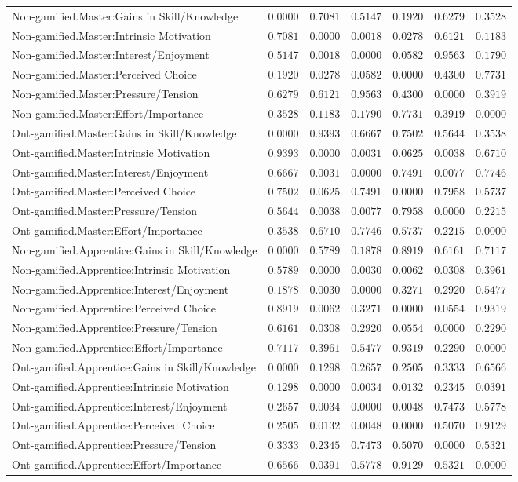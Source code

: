 \begin{landscape}
{\begin{longtable}{lrrrrrr}
Non-gamified.Master:Gains in Skill/Knowledge&$0.0000$&$0.7081$&$0.5147$&$0.1920$&$0.6279$&$0.3528$\tabularnewline
Non-gamified.Master:Intrinsic Motivation&$0.7081$&$0.0000$&$0.0018$&$0.0278$&$0.6121$&$0.1183$\tabularnewline
Non-gamified.Master:Interest/Enjoyment&$0.5147$&$0.0018$&$0.0000$&$0.0582$&$0.9563$&$0.1790$\tabularnewline
Non-gamified.Master:Perceived Choice&$0.1920$&$0.0278$&$0.0582$&$0.0000$&$0.4300$&$0.7731$\tabularnewline
Non-gamified.Master:Pressure/Tension&$0.6279$&$0.6121$&$0.9563$&$0.4300$&$0.0000$&$0.3919$\tabularnewline
Non-gamified.Master:Effort/Importance&$0.3528$&$0.1183$&$0.1790$&$0.7731$&$0.3919$&$0.0000$\tabularnewline
\hline


Ont-gamified.Master:Gains in Skill/Knowledge&$0.0000$&$0.9393$&$0.6667$&$0.7502$&$0.5644$&$0.3538$\tabularnewline
Ont-gamified.Master:Intrinsic Motivation&$0.9393$&$0.0000$&$0.0031$&$0.0625$&$0.0038$&$0.6710$\tabularnewline
Ont-gamified.Master:Interest/Enjoyment&$0.6667$&$0.0031$&$0.0000$&$0.7491$&$0.0077$&$0.7746$\tabularnewline
Ont-gamified.Master:Perceived Choice&$0.7502$&$0.0625$&$0.7491$&$0.0000$&$0.7958$&$0.5737$\tabularnewline
Ont-gamified.Master:Pressure/Tension&$0.5644$&$0.0038$&$0.0077$&$0.7958$&$0.0000$&$0.2215$\tabularnewline
Ont-gamified.Master:Effort/Importance&$0.3538$&$0.6710$&$0.7746$&$0.5737$&$0.2215$&$0.0000$\tabularnewline
\hline
\newpage


Non-gamified.Apprentice:Gains in Skill/Knowledge&$0.0000$&$0.5789$&$0.1878$&$0.8919$&$0.6161$&$0.7117$\tabularnewline
Non-gamified.Apprentice:Intrinsic Motivation&$0.5789$&$0.0000$&$0.0030$&$0.0062$&$0.0308$&$0.3961$\tabularnewline
Non-gamified.Apprentice:Interest/Enjoyment&$0.1878$&$0.0030$&$0.0000$&$0.3271$&$0.2920$&$0.5477$\tabularnewline
Non-gamified.Apprentice:Perceived Choice&$0.8919$&$0.0062$&$0.3271$&$0.0000$&$0.0554$&$0.9319$\tabularnewline
Non-gamified.Apprentice:Pressure/Tension&$0.6161$&$0.0308$&$0.2920$&$0.0554$&$0.0000$&$0.2290$\tabularnewline
Non-gamified.Apprentice:Effort/Importance&$0.7117$&$0.3961$&$0.5477$&$0.9319$&$0.2290$&$0.0000$\tabularnewline
\hline


Ont-gamified.Apprentice:Gains in Skill/Knowledge&$0.0000$&$0.1298$&$0.2657$&$0.2505$&$0.3333$&$0.6566$\tabularnewline
Ont-gamified.Apprentice:Intrinsic Motivation&$0.1298$&$0.0000$&$0.0034$&$0.0132$&$0.2345$&$0.0391$\tabularnewline
Ont-gamified.Apprentice:Interest/Enjoyment&$0.2657$&$0.0034$&$0.0000$&$0.0048$&$0.7473$&$0.5778$\tabularnewline
Ont-gamified.Apprentice:Perceived Choice&$0.2505$&$0.0132$&$0.0048$&$0.0000$&$0.5070$&$0.9129$\tabularnewline
Ont-gamified.Apprentice:Pressure/Tension&$0.3333$&$0.2345$&$0.7473$&$0.5070$&$0.0000$&$0.5321$\tabularnewline
Ont-gamified.Apprentice:Effort/Importance&$0.6566$&$0.0391$&$0.5778$&$0.9129$&$0.5321$&$0.0000$\tabularnewline
\hline

\end{longtable}}\end{landscape}


